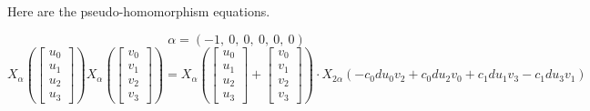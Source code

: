 \documentclass[11pt]{article}
\newcommand{\noi}{\noindent}
\theoremstyle{definition}
\begin{document}
\bigskip

\noi Here are the pseudo-homomorphism equations.

\[
\alpha = \left( -1, \  0, \  0, \  0, \  0, \  0\right)
\]
\[
X_{\alpha}\left(\left[\begin{matrix}u_{0}\\u_{1}\\u_{2}\\u_{3}\end{matrix}\right]\right) X_{\alpha}\left(\left[\begin{matrix}v_{0}\\v_{1}\\v_{2}\\v_{3}\end{matrix}\right]\right) = X_{\alpha}\left(\left[\begin{matrix}u_{0}\\u_{1}\\u_{2}\\u_{3}\end{matrix}\right] + \left[\begin{matrix}v_{0}\\v_{1}\\v_{2}\\v_{3}\end{matrix}\right]\right) \cdot X_{2\alpha}\left(- c_{0} d u_{0} v_{2} + c_{0} d u_{2} v_{0} + c_{1} d u_{1} v_{3} - c_{1} d u_{3} v_{1}\right)
\]
\end{document}
